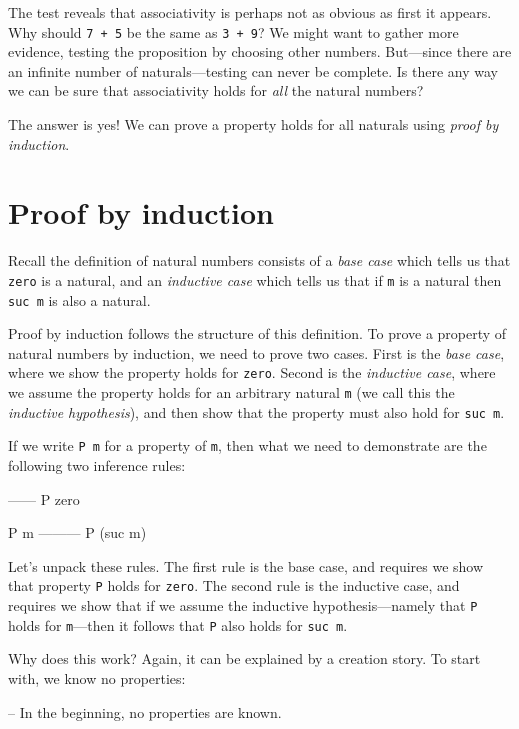 The test reveals that associativity is perhaps not as obvious as first
it appears. Why should \texttt{7\ +\ 5} be the same as \texttt{3\ +\ 9}?
We might want to gather more evidence, testing the proposition by
choosing other numbers. But---since there are an infinite number of
naturals---testing can never be complete. Is there any way we can be
sure that associativity holds for \emph{all} the natural numbers?

The answer is yes! We can prove a property holds for all naturals using
\emph{proof by induction}.

\hypertarget{proof-by-induction}{%
\section{Proof by induction}\label{proof-by-induction}}

Recall the definition of natural numbers consists of a \emph{base case}
which tells us that \texttt{zero} is a natural, and an \emph{inductive
case} which tells us that if \texttt{m} is a natural then
\texttt{suc\ m} is also a natural.

Proof by induction follows the structure of this definition. To prove a
property of natural numbers by induction, we need to prove two cases.
First is the \emph{base case}, where we show the property holds for
\texttt{zero}. Second is the \emph{inductive case}, where we assume the
property holds for an arbitrary natural \texttt{m} (we call this the
\emph{inductive hypothesis}), and then show that the property must also
hold for \texttt{suc\ m}.

If we write \texttt{P\ m} for a property of \texttt{m}, then what we
need to demonstrate are the following two inference rules:

\begin{myDisplay}
------
P zero

P m
---------
P (suc m)
\end{myDisplay}

Let's unpack these rules. The first rule is the base case, and requires
we show that property \texttt{P} holds for \texttt{zero}. The second
rule is the inductive case, and requires we show that if we assume the
inductive hypothesis---namely that \texttt{P} holds for
\texttt{m}---then it follows that \texttt{P} also holds for
\texttt{suc\ m}.

Why does this work? Again, it can be explained by a creation story. To
start with, we know no properties:

\begin{myDisplay}
-- In the beginning, no properties are known.
\end{myDisplay}

